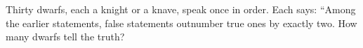 Thirty dwarfs, each a knight or a knave, speak once in order. Each says: ``Among the earlier statements, false statements outnumber true ones by exactly two. How many dwarfs tell the truth?

